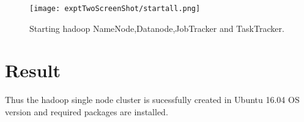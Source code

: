 \documentclass[a4paper,10pt]{article}
\begin{document}
    \begin{figure}[h]
    	\texttt{[image: exptTwoScreenShot/startall.png]}
    	\caption{Starting hadoop NameNode,Datanode,JobTracker and TaskTracker.}
    	\label{fig:11}
    \end{figure}
    

\section{Result}
Thus the hadoop single node cluster is sucessfully created in Ubuntu 16.04 OS version and required packages are installed.
\end{document}
